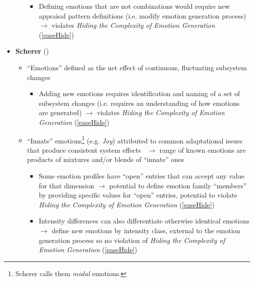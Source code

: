 \begin{itemize}
\begin{itemize}
\begin{itemize}
            \item Defining emotions that are not combinations would require new
            appraisal pattern definitions (i.e. modify emotion generation
            process) $\rightarrow$ violates \textit{Hiding the Complexity of
                Emotion Generation} (\ref{easeHide})
        \end{itemize}
    \end{itemize}

    \item \textbf{Scherer} (\good)
    \begin{itemize}
        \item ``Emotions'' defined as the net effect of continuous,
        fluctuating subsystem changes~\citep[p.~106, 108]{scherer2001appraisalB}
        \begin{itemize}
            \item Adding new emotions requires identification and naming of a
            set of subsystem changes (i.e. requires an understanding of how
            emotions are generated) $\rightarrow$ violates \textit{Hiding the
                Complexity of Emotion Generation} (\ref{easeHide})
        \end{itemize}

        \item ``Innate'' emotions\footnote{Scherer calls them \textit{modal}
            emotions.} (e.g. \textit{Joy}) attributed to common adaptational
            issues
        that produce consistent system effects~\citep[p.~108,
        113]{scherer2001appraisalB} $\rightarrow$ range of known emotions are
        products of mixtures and/or blends of ``innate'' ones
        \begin{itemize}
            \item Some emotion profiles have ``open'' entries that can accept
            any value for that dimension $\rightarrow$ potential to define
            emotion family ``members'' by providing specific values for
            ``open'' entries, potential to violate \textit{Hiding the
                Complexity of Emotion Generation} (\ref{easeHide})

            \item Intensity differences can also differentiate otherwise
            identical emotions $\rightarrow$ define new emotions by intensity
            class, external to the emotion generation process so no violation
            of \textit{Hiding the Complexity of Emotion Generation}
            (\ref{easeHide})
        \end{itemize}
    \end{itemize}


\end{itemize}
